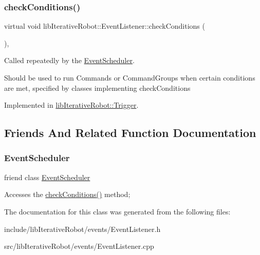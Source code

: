 \subsubsection{\texorpdfstring{checkConditions()}{checkConditions()}}
{\footnotesize\ttfamily virtual void lib\+Iterative\+Robot\+::\+Event\+Listener\+::check\+Conditions (\begin{DoxyParamCaption}{ }\end{DoxyParamCaption})\hspace{0.3cm}{\ttfamily [protected]}, {}}



Called repeatedly by the \mbox{\hyperlink{classlib_iterative_robot_1_1_event_scheduler}{Event\+Scheduler}}. 

Should be used to run Commands or Command\+Groups when certain conditions are met, specified by classes implementing check\+Conditions 

Implemented in \mbox{\hyperlink{classlib_iterative_robot_1_1_trigger_ac89c07cd514a1af516dd7f773cbedcab}{lib\+Iterative\+Robot\+::\+Trigger}}.



\subsection{Friends And Related Function Documentation}
\mbox{\label{classlib_iterative_robot_1_1_event_listener_a2a47195be57876de9e0c9e18467a34a3}} 
\subsubsection{\texorpdfstring{EventScheduler}{EventScheduler}}
{\footnotesize\ttfamily friend class \mbox{\hyperlink{classlib_iterative_robot_1_1_event_scheduler}{Event\+Scheduler}}\hspace{0.3cm}{\ttfamily [friend]}}

Accesses the \mbox{\hyperlink{classlib_iterative_robot_1_1_event_listener_aacbdd1cd66bf22e081add72b127af3a1}{check\+Conditions()}} method; 

The documentation for this class was generated from the following files\+:\begin{DoxyCompactItemize}
\item 
include/lib\+Iterative\+Robot/events/Event\+Listener.\+h\item 
src/lib\+Iterative\+Robot/events/Event\+Listener.\+cpp\end{DoxyCompactItemize}
